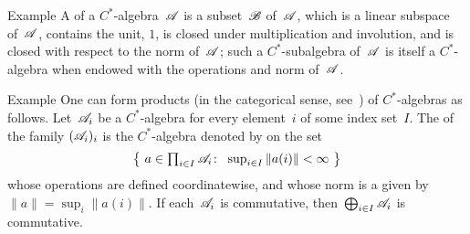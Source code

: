 \documentclass[a]{subfiles}
\begin{document}
\begin{parsec}
\begin{point}{Example}
A %
of a $C^*$-algebra~$\mathscr{A}$
is a subset~$\mathscr{B}$ of~$\mathscr{A}$,
which is a linear subspace of~$\mathscr{A}$,
contains the unit, $1$, is closed under multiplication
and involution, 
and is closed with respect to the norm of~$\mathscr{A}$;
such a $C^*$-subalgebra of~$\mathscr{A}$
is itself a $C^*$-algebra
when endowed with the operations and norm
of~$\mathscr{A}$.
\end{point}
\begin{point}{Example}%
One can form products (in the categorical sense,
see~) of $C^*$-algebras as follows.
Let~$\mathscr{A}_i$ be a $C^*$-algebra
for every element~$i$ of some index set~$I$.
The %
of the family $(\mathscr{A}_i)_i$
is the $C^*$-algebra
denoted by  on the set
\begin{equation*}
\textstyle
\bigl\{\ 
a\in \prod_{i\in I}\scrA_i\colon\  \sup_{i \in I} \|a(i)\|< \infty \ 
\bigr\}
\end{equation*}
whose operations are defined coordinatewise,
and whose norm is a %
\index{supremum norm}%
given by $\|a\|=\sup_{i}\|a(i)\|$.
If each~$\mathscr{A}_i$ is commutative,
then~$\bigoplus_{i\in I}\mathscr{A}_i$
is commutative.


\end{point}
\end{parsec}
\end{document}
